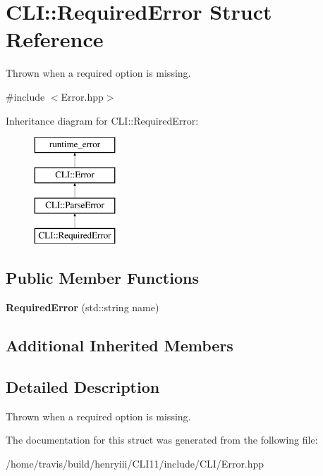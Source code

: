 \hypertarget{struct_c_l_i_1_1_required_error}{}\section{C\+LI\+:\+:Required\+Error Struct Reference}
\label{struct_c_l_i_1_1_required_error}


Thrown when a required option is missing.  




{\ttfamily \#include $<$Error.\+hpp$>$}

Inheritance diagram for C\+LI\+:\+:Required\+Error\+:\begin{figure}[H]
\begin{center}
\leavevmode
\includegraphics[height=4.000000cm]{struct_c_l_i_1_1_required_error}
\end{center}
\end{figure}
\subsection*{Public Member Functions}
\begin{DoxyCompactItemize}
\item 
\mbox{\label{struct_c_l_i_1_1_required_error_a13150580687c3277d6d96cc0959c2adc}} 
{\bfseries Required\+Error} (std\+::string name)
\end{DoxyCompactItemize}
\subsection*{Additional Inherited Members}


\subsection{Detailed Description}
Thrown when a required option is missing. 

The documentation for this struct was generated from the following file\+:\begin{DoxyCompactItemize}
\item 
/home/travis/build/henryiii/\+C\+L\+I11/include/\+C\+L\+I/Error.\+hpp\end{DoxyCompactItemize}
